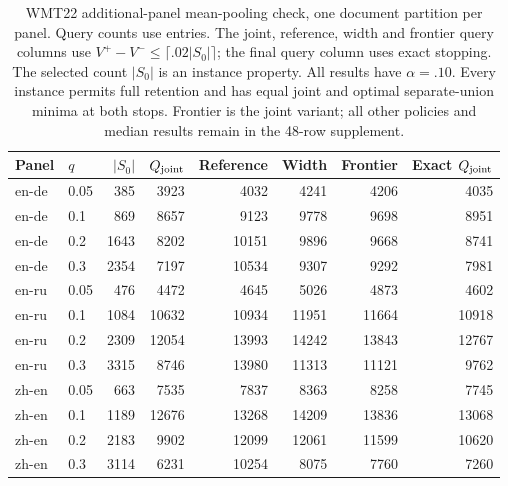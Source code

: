 \begin{table}[t]
\centering\small
\begin{tabular}{llrrrrrr}
\toprule
Panel & $q$ & $|S_0|$ & $Q_{\rm joint}$ & Reference & Width & Frontier & Exact $Q_{\rm joint}$ \\
\midrule
en-de & 0.05 & 385 & 3923 & 4032 & 4241 & 4206 & 4035 \\
en-de & 0.1 & 869 & 8657 & 9123 & 9778 & 9698 & 8951 \\
en-de & 0.2 & 1643 & 8202 & 10151 & 9896 & 9668 & 8741 \\
en-de & 0.3 & 2354 & 7197 & 10534 & 9307 & 9292 & 7981 \\
en-ru & 0.05 & 476 & 4472 & 4645 & 5026 & 4873 & 4602 \\
en-ru & 0.1 & 1084 & 10632 & 10934 & 11951 & 11664 & 10918 \\
en-ru & 0.2 & 2309 & 12054 & 13993 & 14242 & 13843 & 12767 \\
en-ru & 0.3 & 3315 & 8746 & 13980 & 11313 & 11121 & 9762 \\
zh-en & 0.05 & 663 & 7535 & 7837 & 8363 & 8258 & 7745 \\
zh-en & 0.1 & 1189 & 12676 & 13268 & 14209 & 13836 & 13068 \\
zh-en & 0.2 & 2183 & 9902 & 12099 & 12061 & 11599 & 10620 \\
zh-en & 0.3 & 3114 & 6231 & 10254 & 8075 & 7760 & 7260 \\
\bottomrule
\end{tabular}
\caption{WMT22 additional-panel mean-pooling check, one document partition per panel. Query counts use entries. The joint, reference, width and frontier query columns use $V^+-V^-\le\lceil.02|S_0|\rceil$; the final query column uses exact stopping. The selected count $|S_0|$ is an instance property. All results have $\alpha=.10$. Every instance permits full retention and has equal joint and optimal separate-union minima at both stops. Frontier is the joint variant; all other policies and median results remain in the 48-row supplement.}
\label{tab:wmt22-confirmation}
\end{table}
